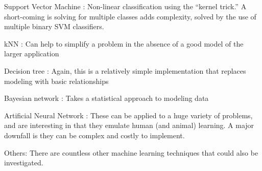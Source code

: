 \begin{description}
  \item{Support Vector Machine \cite{SVM}:} Non-linear classification using the ``kernel trick.'' A short-coming is solving for multiple
  classes adds complexity, solved by the use of multiple binary SVM classifiers.
  \item{kNN \cite{KNN}:} Can help to simplify a problem in the absence of a good model of the larger application
  \item{Decision tree \cite{DecisionTree}:} Again, this is a relatively simple implementation that replaces modeling with basic relationships
  \item{Bayesian network \cite{BayesianNetwork}:} Takes a statistical approach to modeling data
  \item{Artificial Neural Network \cite{ANN}:} These can be applied to a huge variety of problems, and are interesting in that they emulate
  human (and animal) learning. A major downfall is they can be complex and costly to implement.
  \item{Others:} There are countless other machine learning techniques that could also be investigated.
\end{description}